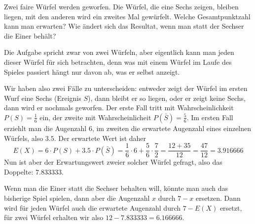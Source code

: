 Zwei faire Würfel werden geworfen. Die Würfel, die eine Sechs
zeigen, bleiben liegen, mit den anderen wird ein zweites Mal gewürfelt.
Welche Gesamtpunktzahl kann man erwarten?
Wie ändert sich das Resultat, wenn man statt der Sechser die Einer
behält?


\begin{loesung}
Die Aufgabe spricht zwar von zwei Würfeln, aber eigentlich kann man
jeden dieser Würfel für sich betrachten, denn was mit einem Würfel
im Laufe des Spieles passiert hängt nur davon ab, was er selbst
anzeigt.

Wir haben also zwei Fälle zu unterscheiden: entweder zeigt der
Würfel im ersten Wurf eine Sechs (Ereignis $S$), dann bleibt er so liegen,
oder er zeigt keine Sechs, dann wird er nochmals geworfen.
Der erste Fall tritt mit Wahrscheinlichkeit $P(S)=\frac16$ ein,
der zweite mit Wahrscheinlicheit $P(\bar{S})=\frac56$. Im ersten Fall
erziehlt man die Augenzahl $6$, im zweiten die erwartete
Augenzahl eines einzelnen Würfels, also $3.5$. Der erwartete
Wert ist daher
\[
E(X)=6\cdot P(S) + 3.5 \cdot P(\bar S)=
\frac16\cdot 6 +\frac56\cdot\frac72=\frac{12+35}{12}=\frac{47}{12}=3.916666
\]
Nun ist aber der Erwartungswert zweier solcher Würfel
gefragt, also das Doppelte: $7.833333$.

Wenn man die Einer statt die Sechser behalten will, könnte man
auch das bisherige Spiel spielen, dann aber die Augenzahl
$x$ durch $7-x$ ersetzen. Dann wird für jeden Würfel auch
die erwartete Augenzahl durch $7-E(X)$ ersetzt, für zwei
Würfel erhalten wir also $12-7.833333 = 6.166666$.


\end{loesung}
